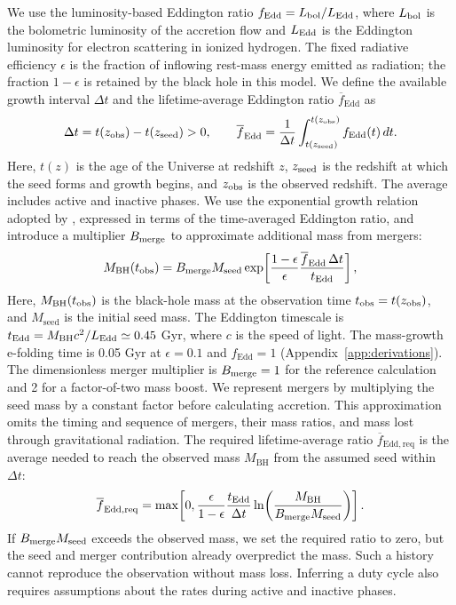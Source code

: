 \documentclass[pdflatex,sn-basic]{sn-jnl}
\newcommand{\fedd}{f_{\mathrm{Edd}}}
\newcommand{\mbh}{M_{\mathrm{BH}}}
\newcommand{\mseed}{M_{\mathrm{seed}}}
\begin{document}
We use the luminosity-based Eddington ratio $\fedd=L_{\rm bol}/L_{\rm Edd}$,
where $L_{\rm bol}$ is the bolometric luminosity of the accretion flow and
$L_{\rm Edd}$ is the Eddington luminosity for electron scattering in ionized hydrogen.
The fixed radiative efficiency $\epsilon$ is the fraction of inflowing
rest-mass energy emitted as radiation; the fraction $1-\epsilon$ is retained
by the black hole in this model. We define the available growth interval
$\Delta t$ and the lifetime-average Eddington ratio $\overline{f}_{\mathrm{Edd}}$ as
\begin{equation}
\Delta t=t(z_{\rm obs})-t(z_{\rm seed})>0,\qquad
\overline{f}_{\mathrm{Edd}}=\frac{1}{\Delta t}
\int_{t(z_{\rm seed})}^{t(z_{\rm obs})}\fedd(t)\,dt.
\label{eq:average}
\end{equation}
Here, $t(z)$ is the age of the Universe at redshift $z$, $z_{\rm seed}$ is
the redshift at which the seed forms and growth begins, and $z_{\rm obs}$ is
the observed redshift. The average includes active and inactive phases.
We use the exponential growth relation adopted by \citet{dayal2024},
expressed in terms of the time-averaged Eddington ratio, and introduce
a multiplier $B_{\rm merge}$ to approximate additional mass from mergers:
\begin{equation}
\mbh(t_{\rm obs})=B_{\rm merge}\mseed
\exp\!\left[\frac{1-\epsilon}{\epsilon}
\frac{\overline{f}_{\mathrm{Edd}}\,\Delta t}{t_{\rm Edd}}\right],
\label{eq:growth}
\end{equation}
Here, $\mbh(t_{\rm obs})$ is the black-hole mass at the observation time
$t_{\rm obs}=t(z_{\rm obs})$, and $\mseed$ is the initial seed mass.
The Eddington timescale is $t_{\rm Edd}=\mbh c^2/L_{\rm Edd}\simeq0.45$ Gyr,
where $c$ is the speed of light. The mass-growth e-folding time is 0.05 Gyr at
$\epsilon=0.1$ and $\fedd=1$ (Appendix~\ref{app:derivations}).
The dimensionless merger multiplier is
$B_{\rm merge}=1$ for the reference calculation and 2 for a factor-of-two
mass boost. We represent mergers by multiplying the seed mass by a constant
factor before calculating accretion. This approximation omits the timing and
sequence of mergers, their mass ratios, and mass lost through gravitational radiation.
The required lifetime-average ratio $\overline{f}_{\mathrm{Edd,req}}$ is the
average needed to reach the observed mass $\mbh$ from the assumed seed
within $\Delta t$:
\begin{equation}
\overline{f}_{\mathrm{Edd,req}}
=\max\!\left[0,\frac{\epsilon}{1-\epsilon}
\frac{t_{\rm Edd}}{\Delta t}
\ln\!\left(\frac{\mbh}{B_{\rm merge}\mseed}\right)\right].
\label{eq:required-rate}
\end{equation}
If $B_{\rm merge}M_{\rm seed}$ exceeds the observed mass, we set the required
ratio to zero, but the seed and merger contribution already overpredict the mass. Such a
history cannot reproduce the observation without mass loss. Inferring a duty
cycle also requires assumptions about the rates during active and inactive phases.
\end{document}
